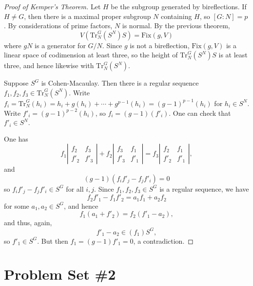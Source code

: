 \documentclass[12pt]{amsart}
\theoremstyle{definition}
\numberwithin{equation}{theorem}
\begin{document}
\begin{samepage}

\begin{proof}[Proof of Kemper's Theorem]
Let $H$ be the subgroup generated by bireflections. If $H\neq G$, then there is a maximal proper subgroup $N$ containing $H$, so $[G:N]=p$. By considerations of prime factors, $N$ is normal. By the previous theorem,
\[ V( \mathrm{Tr}^G_N(S^N) S) = \mathrm{Fix}(g,V)\]
where $gN$ is a generator for $G/N$. Since $g$ is not a bireflection, $\mathrm{Fix}(g,V)$ is a linear space of codimension at least three, so the height of $\mathrm{Tr}^G_N(S^N) S$ is at least three, and hence likewise with $\mathrm{Tr}^G_N(S^N)$. 

Suppose $S^G$ is Cohen-Macaulay. Then there is a regular sequence $f_1,f_2,f_3 \in \mathrm{Tr}^G_N(S^N)$. Write 
$f_i = \mathrm{Tr}^G_N(h_i) = h_i+ g(h_i) + \cdots + g^{p-1}(h_i) = (g-1)^{p-1}(h_i)$ for $h_i\in S^N$. Write $f'_i = (g-1)^{p-2}(h_i)$, so $f_i = (g-1)(f'_i)$. One can check that $f'_i\in S^N$.

One has 
\[ f_1 \left| \begin{matrix} f_2 & f_3 \\ f'_2 & f'_3 \end{matrix} \right| + f_2 \left| \begin{matrix} f_3 & f_1 \\ f'_3 & f'_1 \end{matrix} \right| = f_3 \left| \begin{matrix} f_2 & f_1 \\ f'_2 & f'_1 \end{matrix} \right|,\]
and 
\[ (g-1) (f_i f'_j - f_j f'_i) = 0\]
so $f_i f'_j - f_j f'_i\in S^G$ for all $i,j$. Since $f_1,f_2,f_3\in S^G$ is a regular sequence, we have
\[ f_2 f'_1 - f_1 f'_2 = a_1 f_1 +a_2 f_2\]
for some $a_1,a_2\in S^G$, and hence
\[ f_1 (a_1 + f'_2) = f_2 (f'_1 - a_2),\]
and thus, again, 
\[ f'_1 - a_2 \in (f_1) S^G,\]
so $f'_1\in S^G$. But then $f_1 = (g-1) f'_1 = 0$, a contradiction.
\end{proof}
\end{samepage}

\newpage

\section*{Problem Set \#2}
\end{document}
